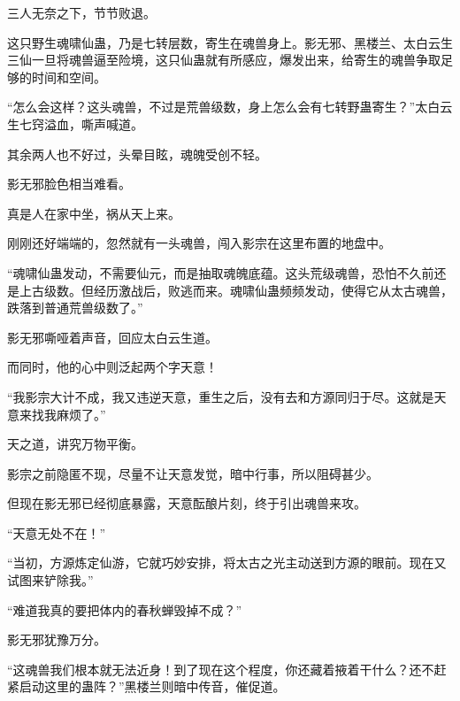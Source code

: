 \begin{this_body}
三人无奈之下，节节败退。

这只野生魂啸仙蛊，乃是七转层数，寄生在魂兽身上。影无邪、黑楼兰、太白云生三仙一旦将魂兽逼至险境，这只仙蛊就有所感应，爆发出来，给寄生的魂兽争取足够的时间和空间。

“怎么会这样？这头魂兽，不过是荒兽级数，身上怎么会有七转野蛊寄生？”太白云生七窍溢血，嘶声喊道。

其余两人也不好过，头晕目眩，魂魄受创不轻。

影无邪脸色相当难看。

真是人在家中坐，祸从天上来。

刚刚还好端端的，忽然就有一头魂兽，闯入影宗在这里布置的地盘中。

“魂啸仙蛊发动，不需要仙元，而是抽取魂魄底蕴。这头荒级魂兽，恐怕不久前还是上古级数。但经历激战后，败逃而来。魂啸仙蛊频频发动，使得它从太古魂兽，跌落到普通荒兽级数了。”

影无邪嘶哑着声音，回应太白云生道。

而同时，他的心中则泛起两个字天意！

“我影宗大计不成，我又违逆天意，重生之后，没有去和方源同归于尽。这就是天意来找我麻烦了。”

天之道，讲究万物平衡。

影宗之前隐匿不现，尽量不让天意发觉，暗中行事，所以阻碍甚少。

但现在影无邪已经彻底暴露，天意酝酿片刻，终于引出魂兽来攻。

“天意无处不在！”

“当初，方源炼定仙游，它就巧妙安排，将太古之光主动送到方源的眼前。现在又试图来铲除我。”

“难道我真的要把体内的春秋蝉毁掉不成？”

影无邪犹豫万分。

“这魂兽我们根本就无法近身！到了现在这个程度，你还藏着掖着干什么？还不赶紧启动这里的蛊阵？”黑楼兰则暗中传音，催促道。

\end{this_body}

